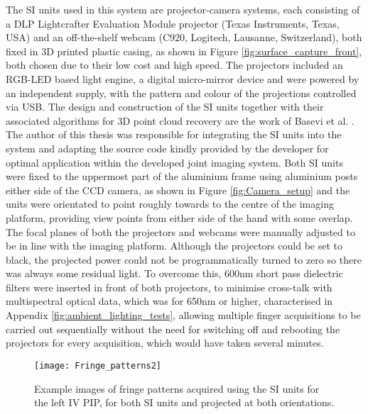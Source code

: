 \documentclass[twoside]{bhamthesis}
\theoremstyle{definition}
\begin{document}
The SI units used in this system are projector-camera systems, each consisting of a DLP Lightcrafter Evaluation Module projector (Texas Instruments, Texas, USA) and an off-the-shelf webcam (C920, Logitech, Lausanne, Switzerland), both fixed in 3D printed plastic casing, as shown in Figure \ref{fig:surface_capture_front}, both chosen due to their low cost and high speed. The projectors included an RGB-LED based light engine, a digital micro-mirror device and were powered by an independent supply, with the pattern and colour of the projections controlled via USB. The design and construction of the SI units together with their associated algorithms for 3D point cloud recovery are the work of Basevi et al. \cite{basevi2013simultaneous}. The author of this thesis was responsible for integrating the SI units into the system and adapting the source code kindly provided by the developer for optimal application within the developed joint imaging system. Both SI units were fixed to the uppermost part of the aluminium frame using aluminium posts either side of the CCD camera, as shown in Figure \ref{fig:Camera_setup} and the units were orientated to point roughly towards to the centre of the imaging platform, providing view points from either side of the hand with some overlap. The focal planes of both the projectors and webcams were manually adjusted to be in line with the imaging platform. Although the projectors could be set to black, the projected power could not be programmatically turned to zero so there was always some residual light. To overcome this, 600nm short pass dielectric filters were inserted in front of both projectors, to minimise cross-talk with multispectral optical data, which was for 650nm or higher, characterised in Appendix \ref{fig:ambient_lighting_tests}, allowing multiple finger acquisitions to be carried out sequentially without the need for switching off and rebooting the projectors for every acquisition, which would have taken several minutes.

\begin{figure}[!ht]
\centering
  \texttt{[image: Fringe\_patterns2]}
\caption{Example images of fringe patterns acquired using the SI units for the left IV PIP, for both SI units and projected at both orientations.}
  \label{fig:example_fringe_patterns}
\end{figure} 
\end{document}
